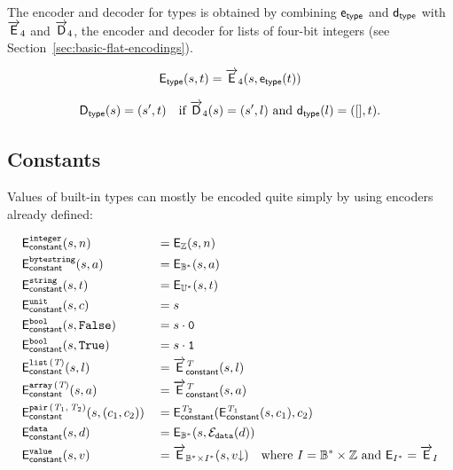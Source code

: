 \noindent The encoder and decoder for types is obtained by combining $\mathsf{e}_{\mathsf{type}}$
and $\mathsf{d}_{\mathsf{type}}$ with $\overrightarrow{\mathsf{E}}_4$ and $\overrightarrow{\mathsf{D}}_4$, the encoder and decoder for lists
of four-bit integers (see Section~\ref{sec:basic-flat-encodings}).

$$
\mathsf{E}_{\mathsf{type}}(s,t) = \overrightarrow{\mathsf{E}}_4 (s, \mathsf{e}_{\mathsf{type}}(t))
$$

$$
\mathsf{D}_{\mathsf{type}}(s) = (s', t) \quad \text{if $\overrightarrow{\mathsf{D}}_4(s) = (s', l)$ and $\mathsf{d}_{\mathsf{type}}(l) = ([], t)$}.
$$

\subsection{Constants}
\label{sec:flat-constants}
Values of built-in types can mostly be encoded quite simply by using encoders
already defined:

\begin{alignat*}{2}
  & \Econstant{\ty{integer}}(s,n)                  &&= \E_{\Z}(s, n) \\
  & \Econstant{\ty{bytestring}}(s,a)               &&= \E_{\B^*}(s, a) \\
  & \Econstant{\ty{string}}(s,t)                   &&= \E_{\U^*}(s, t) \\
  & \Econstant{\ty{unit}}(s,c)                     &&= s  \\
  & \Econstant{\ty{bool}}(s, \texttt{False})       &&= s \cdot \bits{0}\\
  & \Econstant{\ty{bool}}(s, \texttt{True})        &&= s \cdot \bits{1}\\
  & \Econstant{\listOf{\tn}}(s,l)                  &&= \Elist^{\tn}_{\mathsf{constant}}(s, l) \\
  & \Econstant{\arrayOf{\tn}}(s,a)                 &&= \Earray^{\tn}_{\mathsf{constant}}(s, a) \\
  & \Econstant{\pairOf{\tn_1}{\tn_2}}(s,(c_1,c_2)) &&= \Econstant{\tn_2}(\Econstant{\tn_1}(s, c_1), c_2)\\
  & \Econstant{\ty{data}}(s,d)                     &&= \E_{\B^*}(s, \eData(d))\\
  & \Econstant{\ty{value}}(s,v)                    &&= \Elist_{\B^* \times I^*}(s, \flatten{v})
                                                     \quad\text{where $I = \B^* \times \Z$ and $\E_{I^*} = \Elist_I$}
\end{alignat*}


